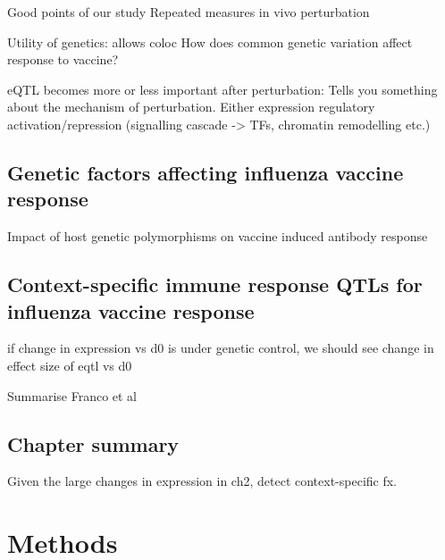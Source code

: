 Good points of our study
    Repeated measures
    in vivo perturbation

Utility of genetics:
allows coloc
How does common genetic variation affect response to vaccine?

eQTL becomes more or less important after perturbation: Tells you something about the mechanism of perturbation.
Either expression regulatory activation/repression (signalling cascade -> TFs, chromatin remodelling etc.)

\subsection{Genetic factors affecting influenza vaccine response}


Impact of host genetic polymorphisms on vaccine induced antibody response


\subsection{Context-specific immune response QTLs for influenza vaccine response}

if change in expression vs d0 is under genetic control, we should see change in effect size of eqtl vs d0

Summarise Franco et al

\subsection{Chapter summary}

Given the large changes in expression in ch2, detect context-specific fx.

\section{Methods}

